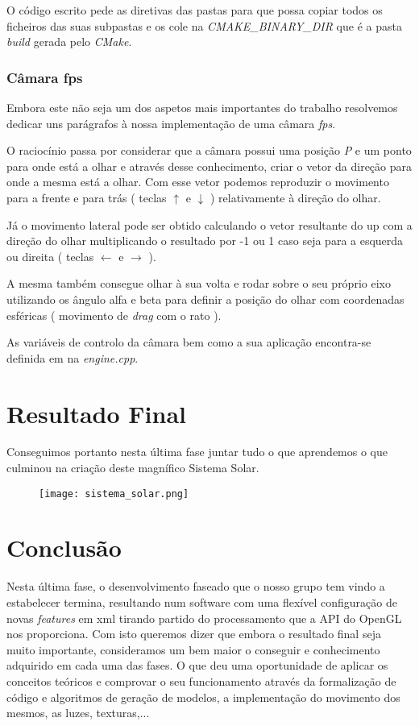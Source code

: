 \documentclass[11pt,a4paper]{report}
\begin{document}
O código escrito pede as diretivas das pastas para que possa copiar todos os ficheiros das suas subpastas e os cole na \emph{CMAKE\_BINARY\_DIR} que é a pasta \emph{build} gerada pelo \emph{CMake}.
\newpage
\subsection{Câmara fps}

Embora este não seja um dos aspetos mais importantes do trabalho resolvemos dedicar uns parágrafos à nossa implementação de uma câmara \emph{fps}.

O raciocínio passa por considerar que a câmara possui uma posição \emph{P} e um ponto para onde está a olhar e através desse conhecimento, criar o vetor da direção para onde a mesma está a olhar. Com esse vetor podemos reproduzir o movimento para a frente e para trás ( teclas $\uparrow$ e $\downarrow$ ) relativamente à direção do olhar.

Já o movimento lateral pode ser obtido calculando o vetor resultante do up com a direção do olhar multiplicando o resultado por -1 ou 1 caso seja para a esquerda ou direita ( teclas $\leftarrow$ e $\rightarrow$ ).

A mesma também consegue olhar à sua volta e rodar sobre o seu próprio eixo utilizando os ângulo alfa e beta para definir a posição do olhar com coordenadas esféricas ( movimento de \emph{drag} com o rato ).

As variáveis de controlo da câmara bem como a sua aplicação encontra-se definida em na \emph{engine.cpp}.

\chapter{Resultado Final}

Conseguimos portanto nesta última fase juntar tudo o que aprendemos o que culminou na criação deste magnífico Sistema Solar.

\begin{figure}[h]
    \centering
    \texttt{[image: sistema\_solar.png]}
\end{figure}

\chapter{Conclusão}

Nesta última fase, o desenvolvimento faseado que o nosso grupo tem vindo a estabelecer termina, resultando num software com uma flexível configuração de novas \emph{features} em xml tirando partido do processamento que a API do OpenGL nos proporciona. Com isto queremos dizer que embora o resultado final seja muito importante, consideramos um bem maior o conseguir e conhecimento adquirido em cada uma das fases. O que deu uma oportunidade de aplicar os conceitos teóricos e comprovar o seu funcionamento através da formalização de código e algoritmos de geração de modelos, a implementação do movimento dos mesmos, as luzes, texturas,...
\end{document}
